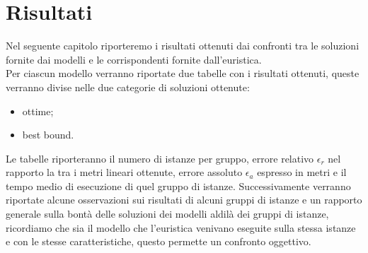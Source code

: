
\hypertarget{(chap:ciucia)}{}
\chapter{Risultati}
Nel seguente capitolo riporteremo i risultati ottenuti dai confronti tra le soluzioni fornite dai modelli e le corrispondenti fornite dall'euristica.\\
Per ciascun modello verranno riportate due tabelle con i risultati ottenuti, queste verranno divise nelle due categorie di soluzioni ottenute:
\begin{itemize}
	\item ottime;
	\item best bound.
\end{itemize} 
Le tabelle riporteranno il numero di istanze per gruppo, errore relativo $\epsilon_r$ nel rapporto la tra i metri lineari ottenute, errore assoluto $\epsilon_a$ espresso in metri e il tempo medio di esecuzione di quel gruppo di istanze. Successivamente verranno riportate alcune osservazioni sui risultati di alcuni gruppi di istanze e un rapporto generale sulla bontà delle soluzioni dei modelli aldilà dei gruppi di istanze, ricordiamo che sia il modello che l'euristica venivano eseguite sulla stessa istanze e con le stesse caratteristiche, questo permette un confronto oggettivo.

\newpage
